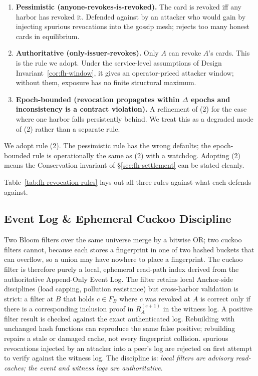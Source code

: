 \documentclass[11pt,a4paper]{article}
\theoremstyle{definition}
\theoremstyle{remark}
\begin{document}
\begin{enumerate}[nosep]
\item \textbf{Pessimistic (anyone-revokes-is-revoked).} The card is revoked iff any harbor has revoked it. Defended against by an attacker who would gain by injecting spurious revocations into the gossip mesh; rejects too many honest cards in equilibrium.
\item \textbf{Authoritative (only-issuer-revokes).} Only $A$ can revoke $A$'s cards. This is the rule we adopt. Under the service-level assumptions of Design Invariant~\ref{cor:fh-window}, it gives an operator-priced attacker window; without them, exposure has no finite structural maximum.
\item \textbf{Epoch-bounded (revocation propagates within $\Delta$ epochs and inconsistency is a contract violation).} A refinement of (2) for the case where one harbor falls persistently behind. We treat this as a degraded mode of (2) rather than a separate rule.
\end{enumerate}

We adopt rule (2). The pessimistic rule has the wrong defaults; the epoch-bounded rule is operationally the same as (2) with a watchdog. Adopting (2) means the Conservation invariant of \S\ref{sec:fh-settlement} can be stated cleanly.

Table~\ref{tab:fh-revocation-rules} lays out all three rules against what each defends against.



\pdexercisepointerone{\ref{ex:fh-revocation-finality}}{\pageref{ex:fh-revocation-finality}}

\subsection{Event Log \& Ephemeral Cuckoo Discipline}\label{sec:fh-cuckoo}

Two Bloom filters over the same universe merge by a bitwise OR; two cuckoo filters cannot, because each stores a fingerprint in one of two hashed buckets that can overflow, so a union may have nowhere to place a fingerprint. The cuckoo filter is therefore purely a local, ephemeral read-path index derived from the authoritative Append-Only Event Log. The filter retains local Anchor-side disciplines (load capping, pollution resistance) but cross-harbor validation is strict: a filter at $B$ that holds $c \in F_B$ where $c$ was revoked at $A$ is correct only if there is a corresponding inclusion proof in $R_A^{(e+1)}$ in the witness log. A positive filter result is checked against the exact authenticated log.
Rebuilding with unchanged hash functions can reproduce the same false positive;
rebuilding repairs a stale or damaged cache, not every fingerprint collision. spurious revocations injected by an attacker into a peer's log are rejected on first attempt to verify against the witness log. The discipline is: \emph{local filters are advisory read-caches; the event and witness logs are authoritative}.
\end{document}
